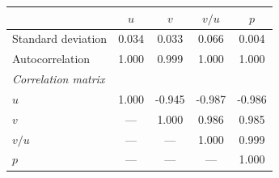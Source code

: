 \begin{tabular}{lcccc}
\toprule
 & $u$ & $v$ & $v/u$ & $p$ \\
\midrule
Standard deviation        &  0.034 &  0.033 &  0.066 &  0.004 \\
Autocorrelation           &  1.000 &  0.999 &  1.000 &  1.000 \\
\midrule
\multicolumn{5}{l}{\textit{Correlation matrix}} \\
$u$   &  1.000 & -0.945 & -0.987 & -0.986 \\
$v$   &   ---  &  1.000 &  0.986 &  0.985 \\
$v/u$ &   ---  &   ---  &  1.000 &  0.999 \\
$p$   &   ---  &   ---  &   ---  &  1.000 \\
\bottomrule
\end{tabular}
